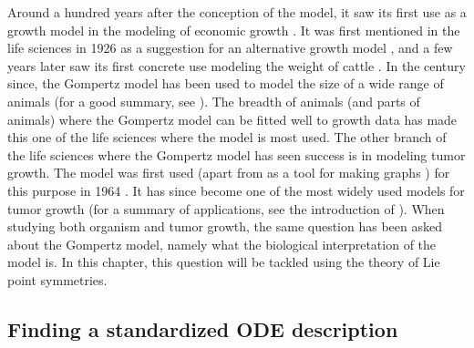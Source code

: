Around a hundred years after the conception of the model, it saw its first use as a growth model in the modeling of economic growth \cite{prescott1922demand,peabody1924railway}.
It was first mentioned in the life sciences in 1926 as a suggestion for an alternative growth model \cite{wright1926reviews}, and a few years later saw its first concrete use modeling the weight of cattle \cite{davidson1928growth}.
In the century since, the Gompertz model has been used to model the size of a wide range of animals (for a good summary, see \cite{tjorve2017gompertz}).
The breadth of animals (and parts of animals) where the Gompertz model can be fitted well to growth data has made this one of the life sciences where the model is most used.
The other branch of the life sciences where the Gompertz model has seen success is in modeling tumor growth.
The model was first used (apart from as a tool for making graphs \cite{casey1934alteration}) for this purpose in 1964 \cite{laird1964dynamics}.
It has since become one of the most widely used models for tumor growth \cite{gerlee2013muddle} (for a summary of applications, see the introduction of \cite{benzekry2014classical}).
When studying both organism and tumor growth, the same question has been asked about the Gompertz model, namely what the biological interpretation of the model is.
In this chapter, this question will be tackled using the theory of Lie point symmetries.

\subsection{Finding a standardized ODE description}

